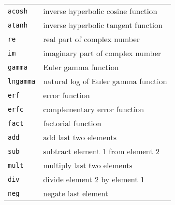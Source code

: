 \documentclass[11pt,notitlepage]{article}
\begin{document}
\begin{center}
\begin{tabular}[t]{|l|l|}
      {\tt acosh} & inverse hyperbolic cosine function \\
      {\tt atanh} & inverse hyperbolic tangent function \\
      {\tt re} & real part of complex number \\
      {\tt im} & imaginary part of complex number \\
      {\tt gamma} & Euler gamma function \\
      {\tt lngamma} & natural log of Euler gamma function \\
      {\tt erf} & error function \\
      {\tt erfc} & complementary error function \\
      {\tt fact} & factorial function \\
      {\tt add} & add last two elements \\
      {\tt sub} & subtract element 1 from element 2 \\
      {\tt mult} & multiply last two elements \\
      {\tt div} & divide element 2 by element 1 \\
      {\tt neg} & negate last element \\
      \hline
   \end{tabular}
\end{center}
\end{document}
